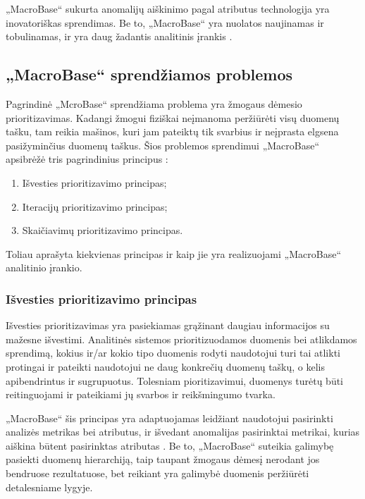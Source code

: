 \documentclass{VUMIFPSkursinis}
\begin{document}
„MacroBase“ sukurta anomalijų aiškinimo pagal atributus technologija yra inovatoriškas sprendimas. Be to, „MacroBase“ yra nuolatos naujinamas ir tobulinamas, ir yra daug žadantis analitinis įrankis \cite{macrobase_overview}.

\subsection{„MacroBase“ sprendžiamos problemos} \label{subsec:macrobase_problemos}
Pagrindinė „McroBase“ sprendžiama problema yra žmogaus dėmesio prioritizavimas. Kadangi žmogui fiziškai neįmanoma peržiūrėti visų duomenų tašku, tam reikia mašinos, kuri jam pateiktų tik svarbius ir neįprasta elgsena pasižyminčius duomenų taškus. Šios problemos sprendimui „MacroBase“ apsibrėžė tris pagrindinius principus \cite{prioritizing_attention}:

\begin{enumerate}
\item Išvesties prioritizavimo principas;
\item Iteracijų prioritizavimo principas;
\item Skaičiavimų prioritizavimo principas.
\end{enumerate} 

Toliau aprašyta kiekvienas principas ir kaip jie yra realizuojami „MacroBase“ analitinio įrankio.

\subsubsection{Išvesties prioritizavimo principas}
Išvesties prioritizavimas yra pasiekiamas grąžinant daugiau informacijos su mažesne išvestimi.  Analitinės sistemos prioritizuodamos duomenis bei atlikdamos sprendimą, kokius ir/ar kokio tipo duomenis rodyti naudotojui turi tai atlikti protingai ir pateikti naudotojui ne daug konkrečių duomenų taškų, o kelis apibendrintus ir sugrupuotus. Tolesniam pioritizavimui, duomenys turėtų būti reitinguojami ir pateikiami jų svarbos ir reikšmingumo tvarka.\par

„MacroBase“ šis principas yra adaptuojamas leidžiant naudotojui pasirinkti analizės metrikas bei atributus, ir išvedant anomalijas pasirinktai metrikai, kurias aiškina būtent pasirinktas atributas \cite{prioritizing_attention}. Be to, „MacroBase“ suteikia galimybę pasiekti duomenų hierarchiją, taip taupant žmogaus dėmesį nerodant jos bendruose rezultatuose, bet reikiant yra galimybė duomenis peržiūrėti detalesniame lygyje.
\end{document}
